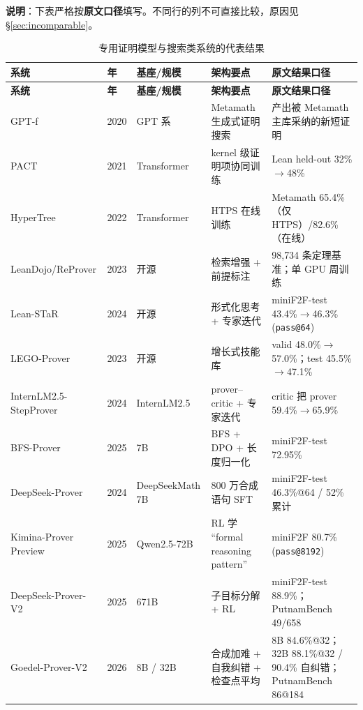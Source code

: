 \documentclass[UTF8,a4paper,11pt,fontset=windows]{ctexart}
\newcommand{\code}[1]{\texttt{#1}}
\newcommand{\brk}{\penalty0\relax}
\begin{document}
\noindent\textbf{说明}：下表严格按\textbf{原文口径}填写。不同行的列不可直接比较，原因见 \S\ref{sec:incomparable}。

{\small
\begin{longtable}{@{}L{2.6cm}L{0.8cm}L{2.4cm}L{4.1cm}L{5.3cm}@{}}
\caption{专用证明模型与搜索类系统的代表结果}\label{tab:specialized}\\
\toprule
\textbf{系统} & \textbf{年} & \textbf{基座/规模} & \textbf{架构要点} & \textbf{原文结果口径} \\
\midrule
\endfirsthead
\toprule
\textbf{系统} & \textbf{年} & \textbf{基座/规模} & \textbf{架构要点} & \textbf{原文结果口径} \\
\midrule
\endhead
\bottomrule
\endfoot
GPT-f & 2020 & GPT 系 & Metamath 生成式证明搜索 & 产出被 Metamath 主库采纳的新短证明 \cite{gptf} \\
PACT & 2021 & Transformer & kernel 级证明项协同训练 & Lean held-out 32\%$\rightarrow$48\% \cite{pact} \\
HyperTree & 2022 & Transformer & HTPS 在线训练 & Metamath 65.4\%（仅 HTPS）/82.6\%（在线）\cite{hypertree} \\
LeanDojo/\allowbreak ReProver & 2023 & 开源 & 检索增强 + 前提标注 & 98{,}734 条定理基准；\newline 单 GPU 周训练 \cite{leandojo} \\
Lean-STaR & 2024 & 开源 & 形式化思考 + 专家迭代 & miniF2F-test 43.4\%$\rightarrow$46.3\% (\code{pass@64}) \cite{leanstar} \\
LEGO-Prover & 2023 & 开源 & 增长式技能库 & valid 48.0\%$\rightarrow$57.0\%；\brk{}test 45.5\%$\rightarrow$47.1\% \cite{lego} \\
InternLM2.5-StepProver & 2024 & InternLM2.5 & prover--critic + 专家迭代 & critic 把 prover 59.4\%$\rightarrow$65.9\% \cite{internlm} \\
BFS-Prover & 2025 & 7B & BFS + DPO + 长度归一化 & miniF2F-test 72.95\% \cite{bfsprover} \\
DeepSeek-Prover & 2024 & DeepSeekMath 7B & 800 万合成语句 SFT & miniF2F-test 46.3\%@64 / 52\% 累计 \cite{dsprover} \\
Kimina-Prover Preview & 2025 & Qwen2.5-72B & RL 学 ``formal reasoning pattern'' & miniF2F 80.7\% (\code{pass@8192}) \cite{kimina} \\
DeepSeek-Prover-V2 & 2025 & 671B & 子目标分解 + RL & miniF2F-test 88.9\%；\brk{}PutnamBench 49/658 \cite{dsprov2} \\
Goedel-Prover-V2 & 2026 & 8B / 32B & 合成加难 + 自我纠错 + 检查点平均 & 8B 84.6\%@32；\brk{}32B 88.1\%@32 / 90.4\% 自纠错\brk{}；\brk{}PutnamBench 86@184 \cite{goedelv2} \\

\end{longtable}}
\end{document}
